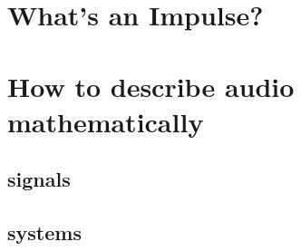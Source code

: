 

\section{What's an Impulse?}



\section{How to describe audio mathematically}




\subsection{signals}

\subsection{systems}


